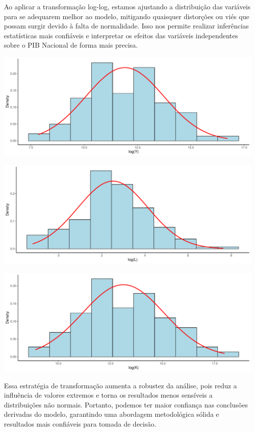 \documentclass[
  letterpaper,
  DIV=11,
  numbers=noendperiod]{scrreprt}
\begin{document}
Ao aplicar a transformação log-log, estamos ajustando a distribuição das
variáveis para se adequarem melhor ao modelo, mitigando quaisquer
distorções ou viés que possam surgir devido à falta de normalidade. Isso
nos permite realizar inferências estatísticas mais confiáveis e
interpretar os efeitos das variáveis independentes sobre o PIB Nacional
de forma mais precisa.

\includegraphics{trabalho_files/figure-pdf/unnamed-chunk-8-1.pdf}

\includegraphics{trabalho_files/figure-pdf/unnamed-chunk-9-1.pdf}

\includegraphics{trabalho_files/figure-pdf/unnamed-chunk-10-1.pdf}

Essa estratégia de transformação aumenta a robustez da análise, pois
reduz a influência de valores extremos e torna os resultados menos
sensíveis a distribuições não normais. Portanto, podemos ter maior
confiança nas conclusões derivadas do modelo, garantindo uma abordagem
metodológica sólida e resultados mais confiáveis para tomada de decisão.
\end{document}
